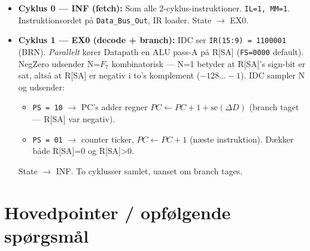 \documentclass[11pt,a4paper]{article}
\begin{document}
\begin{itemize}
  \item \textbf{Cyklus 0 --- \textsc{INF} (fetch):}
        Som alle 2-cyklus-instruktioner. \texttt{IL=1, MM=1}.
        Instruktionsordet på \texttt{Data\_Bus\_Out}, IR loader. State $\rightarrow$ \textsc{EX0}.

  \item \textbf{Cyklus 1 --- \textsc{EX0} (decode + branch):}
        IDC ser \texttt{IR(15:9) = 1100001} (BRN).
        \emph{Parallelt} kører Datapath en ALU pass-A på R[SA] (\texttt{FS=0000} default).
        NegZero udsender N=\(F_7\) kombinatorisk --- N=1 betyder at R[SA]'s sign-bit er sat,
        altså at R[SA] er negativ i to's komplement (\(-128 \ldots -1\)).
        IDC sampler N og udsender:

        \begin{itemize}
          \item[\(N = 1\):] \texttt{PS = 10} $\rightarrow$ PC's adder
                regner \(PC \leftarrow PC + 1 + \mathrm{se}(\Delta D)\) (branch taget --- R[SA] var negativ).
          \item[\(N = 0\):] \texttt{PS = 01} $\rightarrow$ counter ticker,
                \(PC \leftarrow PC + 1\) (næste instruktion). Dækker både R[SA]=0 og R[SA]>0.
        \end{itemize}

        State $\rightarrow$ \textsc{INF}. To cyklusser samlet, uanset om branch tages.
\end{itemize}

\section*{Hovedpointer / opfølgende spørgsmål}
\end{document}
